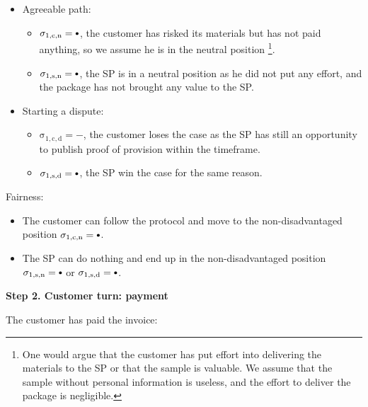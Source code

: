 \documentclass{ieeeaccess}
\newcommand\sbullet[1][.75]{\mathbin{\ThisStyle{\vcenter{\hbox{%
  \scalebox{#1}{$\SavedStyle\bullet$}}}}}%
}
\begin{document}
\begin{itemize}
\item Agreeable path:
  \begin{itemize}
  \item
    \(\operatorname{\sigma_{1, c, n} = \sbullet}\), the customer has risked its materials but has not paid anything, so we assume he is in the neutral position \footnote{One would argue that the customer has put effort into delivering the materials to the SP or that the sample is valuable. We assume that the sample without personal information is useless, and the effort to deliver the package is negligible.}.
  \item
    \(\operatorname{\sigma_{1, s, n} = \sbullet}\), the SP is in a neutral position as he did not put any effort, and the package has not brought any value to the SP.
  \end{itemize}
\item
  Starting a dispute:

  \begin{itemize}
  
  \item
    \(\operatorname{\sigma_{1, c, d} = -}\), the customer loses the case as the SP has still an opportunity to publish proof of provision within the timeframe.
  \item
    \(\operatorname{\sigma_{1, s, d} = \sbullet}\), the SP win the case for the same reason.
  \end{itemize}
\end{itemize}

Fairness:

\begin{itemize}

\item
  The customer can follow the protocol and move to the non-disadvantaged position \(\operatorname{\sigma_{1, c, n} = \sbullet}\).
\item
  The SP can do nothing and end up in the non-disadvantaged position \(\operatorname{\sigma_{1, s, n} = \sbullet}\) or \(\operatorname{\sigma_{1, s, d} = \sbullet}\).
\end{itemize}

\noindent \textbf
{Step 2. Customer turn: payment}\label{step-2-pay-for-invoice}

The customer has paid the invoice:
\end{document}
